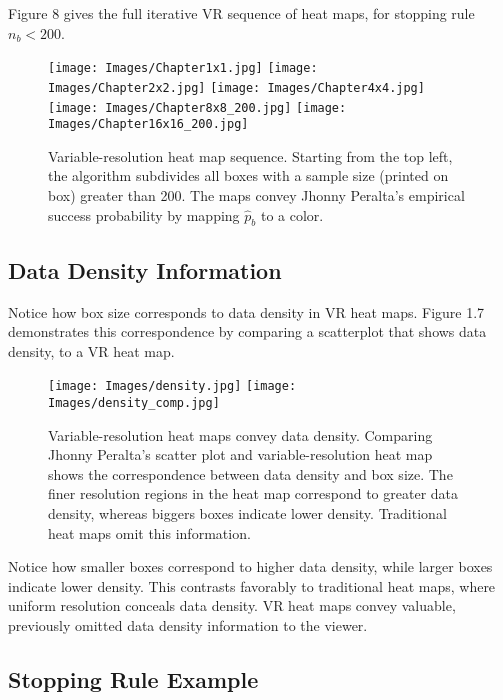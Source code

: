 Figure 8 gives the full iterative VR sequence of heat maps, for stopping rule $n_{b} < 200$.
        \begin{figure}[H]
      	\centering
      	\texttt{[image: Images/Chapter1x1.jpg]}
      	\texttt{[image: Images/Chapter2x2.jpg]}
      	\texttt{[image: Images/Chapter4x4.jpg]}
      	\texttt{[image: Images/Chapter8x8\_200.jpg]} 
      	\texttt{[image: Images/Chapter16x16\_200.jpg]} 
      	\caption{Variable-resolution heat map sequence. Starting from the top left, the algorithm subdivides all boxes with a sample size (printed on box) greater than 200. The maps convey Jhonny Peralta's empirical success probability by mapping $\hat{p}_{b}$ to a color.}
      	\end{figure}
      	
\subsection{Data Density Information}

Notice how box size corresponds to data density in VR heat maps. Figure 1.7 demonstrates this correspondence by comparing a scatterplot that shows data density, to a VR heat map. 
        \begin{figure}[H]
      	\centering
      	\texttt{[image: Images/density.jpg]}
      	\texttt{[image: Images/density\_comp.jpg]} 
      	\caption{Variable-resolution heat maps convey data density. Comparing Jhonny Peralta's scatter plot and variable-resolution heat map shows the correspondence between data density and box size. The finer resolution regions in the heat map correspond to greater data density, whereas biggers boxes indicate lower density. Traditional heat maps omit this information.}
      	\end{figure}
Notice how smaller boxes correspond to higher data density, while larger boxes indicate lower density. This contrasts favorably to traditional heat maps, where uniform resolution conceals data density. VR heat maps convey valuable, previously omitted data density information to the viewer. 
      	
\subsection{Stopping Rule Example} %
      	
